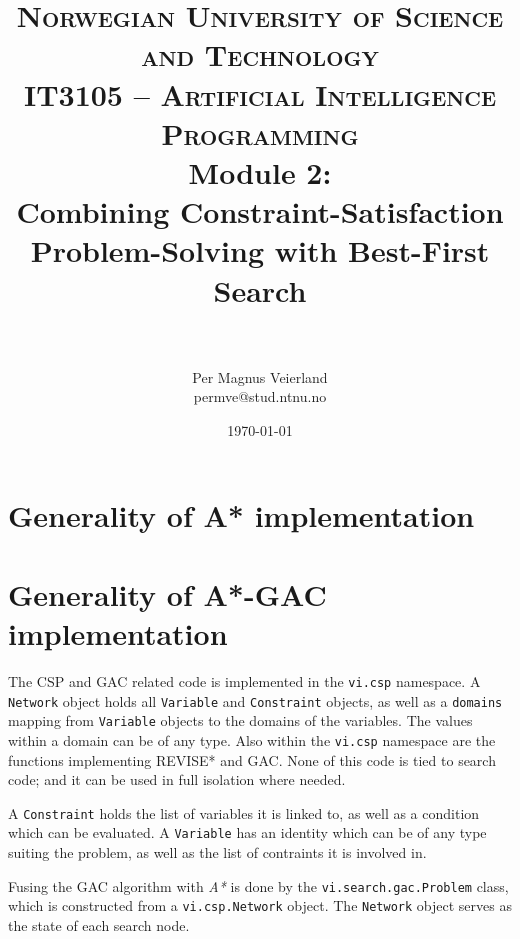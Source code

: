 

\title{	
\normalfont \normalsize 
\textsc{Norwegian University of Science and Technology\\IT3105 -- Artificial Intelligence Programming}
\horrule{0.5pt} \\[0.4cm]
\huge Module 2:\\Combining Constraint-Satisfaction Problem-Solving with Best-First
Search\\
\horrule{2pt} \\[0.5cm]
}

\author{Per Magnus Veierland\\permve@stud.ntnu.no}

\date{\normalsize\today}




\maketitle

\newpage

\section*{Generality of A* implementation}

\section*{Generality of A*-GAC implementation}

The \ac{CSP} and \ac{GAC} related code is implemented in the \texttt{vi.csp} namespace. A \texttt{Network} object holds all \texttt{Variable} and \texttt{Constraint} objects, as well as a \texttt{domains} mapping from \texttt{Variable} objects to the domains of the variables. The values within a domain can be of any type. Also within the \texttt{vi.csp} namespace are the functions implementing \textsc{REVISE*} and \ac{GAC}. None of this code is tied to search code; and it can be used in full isolation where needed.

A \texttt{Constraint} holds the list of variables it is linked to, as well as a condition which can be evaluated. A \texttt{Variable} has an identity which can be of any type suiting the problem, as well as the list of contraints it is involved in.

Fusing the \ac{GAC} algorithm with \textit{A*} is done by the \texttt{vi.search.gac.Problem} class, which is constructed from a \texttt{vi.csp.Network} object. The \texttt{Network} object serves as the state of each search node.

